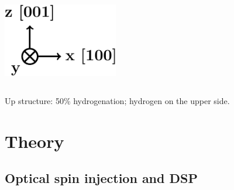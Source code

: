 \documentclass{beamer}
\begin{document}
\begin{frame}
\begin{columns}
\vspace{5mm}

\flushleft
\includegraphics[width=0.9\textwidth]{figs/arrows2.pdf}

\end{columns}

\vspace{-4mm}
\begin{center}
{\Large Up structure:} 50\% hydrogenation; hydrogen on the upper side.
\end{center}

\end{frame}






\section{Theory} 



\subsection{Optical spin injection and DSP}
\end{document}

